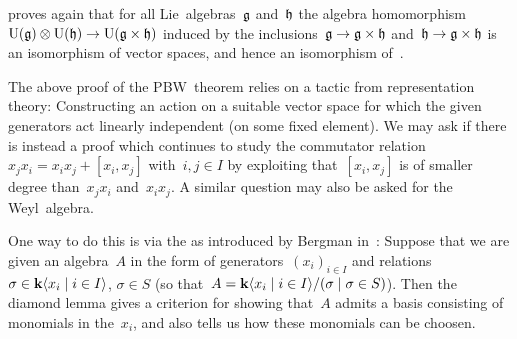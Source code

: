 \begin{remark}
   proves again that for all Lie~algebras~$\mathfrak{g}$ and~$\mathfrak{h}$ the algebra homomorphism~$\operatorname{U}(\mathfrak{g}) \otimes \operatorname{U}(\mathfrak{h}) \to \operatorname{U}(\mathfrak{g} \times \mathfrak{h})$ induced by the inclusions~$\mathfrak{g} \to \mathfrak{g} \times \mathfrak{h}$ and~$\mathfrak{h} \to \mathfrak{g} \times \mathfrak{h}$ is an isomorphism of vector spaces, and hence an isomorphism of~{\algebras{$\kf$}}.
\end{remark}


\begin{remark}
  The above proof of the PBW~theorem relies on a tactic from representation theory:
  Constructing an action on a suitable vector space for which the given generators act linearly independent (on some fixed element).
  We may ask if there is instead a proof which continues to study the commutator relation~$x_j x_i = x_i x_j + [x_i, x_j]$ with~$i, j \in I$ by exploiting that~$[x_i, x_j]$ is of smaller degree than~$x_j x_i$ and~$x_i x_j$.
  A similar question may also be asked for the Weyl~algebra.
  
  One way to do this is via the  as introduced by Bergman in~\cite{diamond_lemma}:
  Suppose that we are given an algebra~$A$ in the form of generators~$(x_i)_{i \in I}$ and relations~$\sigma \in \kf\gen{x_i \suchthat i \in I}$, $\sigma \in S$ (so that~$A = \kf\gen{x_i \suchthat i \in I}/(\sigma \suchthat \sigma \in S)$).
  Then the diamond lemma gives a criterion for showing that~$A$ admits a basis consisting of monomials in the~$x_i$, and also tells us how these monomials can be choosen.
  

\end{remark}
